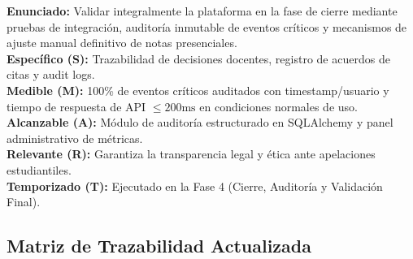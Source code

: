 \documentclass[11pt,a4paper]{article}
\begin{document}
\begin{tcolorbox}[title=OE5: Validación Integral, Auditoría y Cierre de Calificaciones]
\textbf{Enunciado:} Validar integralmente la plataforma en la fase de cierre mediante pruebas de integración, auditoría inmutable de eventos críticos y mecanismos de ajuste manual definitivo de notas presenciales.\\
\textbf{Específico (S):} Trazabilidad de decisiones docentes, registro de acuerdos de citas y audit logs.\\
\textbf{Medible (M):} 100\% de eventos críticos auditados con timestamp/usuario y tiempo de respuesta de API $\le 200\text{ms}$ en condiciones normales de uso.\\
\textbf{Alcanzable (A):} Módulo de auditoría estructurado en SQLAlchemy y panel administrativo de métricas.\\
\textbf{Relevante (R):} Garantiza la transparencia legal y ética ante apelaciones estudiantiles.\\
\textbf{Temporizado (T):} Ejecutado en la Fase 4 (Cierre, Auditoría y Validación Final).
\end{tcolorbox}

\subsection{Matriz de Trazabilidad Actualizada}
\end{document}
